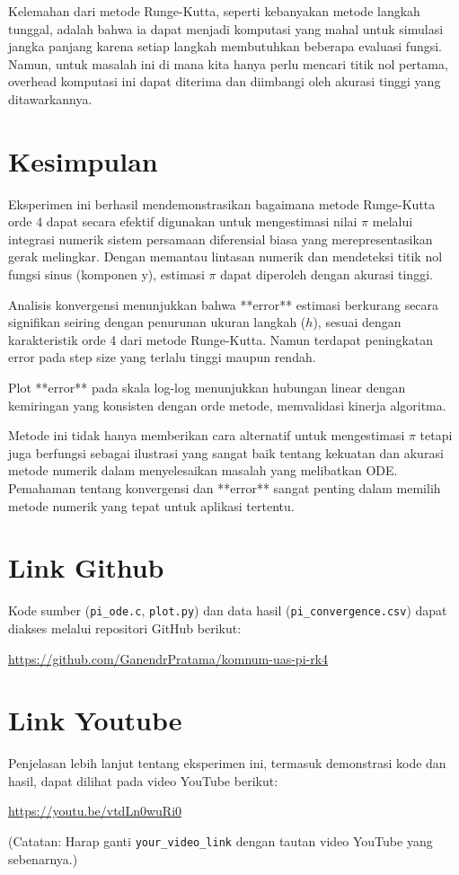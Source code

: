 \documentclass[conference]{IEEEtran}
\begin{document}
Kelemahan dari metode Runge-Kutta, seperti kebanyakan metode langkah tunggal, adalah bahwa ia dapat menjadi komputasi yang mahal untuk simulasi jangka panjang karena setiap langkah membutuhkan beberapa evaluasi fungsi. Namun, untuk masalah ini di mana kita hanya perlu mencari titik nol pertama, overhead komputasi ini dapat diterima dan diimbangi oleh akurasi tinggi yang ditawarkannya.

\section{Kesimpulan}
Eksperimen ini berhasil mendemonstrasikan bagaimana metode Runge-Kutta orde 4 dapat secara efektif digunakan untuk mengestimasi nilai $\pi$ melalui integrasi numerik sistem persamaan diferensial biasa yang merepresentasikan gerak melingkar. Dengan memantau lintasan numerik dan mendeteksi titik nol fungsi sinus (komponen y), estimasi $\pi$ dapat diperoleh dengan akurasi tinggi.

Analisis konvergensi menunjukkan bahwa **error** estimasi berkurang secara signifikan seiring dengan penurunan ukuran langkah ($h$), sesuai dengan karakteristik orde 4 dari metode Runge-Kutta. Namun terdapat peningkatan error pada step size yang terlalu tinggi maupun rendah.

Plot **error** pada skala log-log menunjukkan hubungan linear dengan kemiringan yang konsisten dengan orde metode, memvalidasi kinerja algoritma.

Metode ini tidak hanya memberikan cara alternatif untuk mengestimasi $\pi$ tetapi juga berfungsi sebagai ilustrasi yang sangat baik tentang kekuatan dan akurasi metode numerik dalam menyelesaikan masalah yang melibatkan ODE. Pemahaman tentang konvergensi dan **error** sangat penting dalam memilih metode numerik yang tepat untuk aplikasi tertentu.

\section{Link Github}
Kode sumber (\texttt{pi\_ode.c}, \texttt{plot.py}) dan data hasil (\texttt{pi\_convergence.csv}) dapat diakses melalui repositori GitHub berikut:
\begin{center}
\url{https://github.com/GanendrPratama/komnum-uas-pi-rk4}
\end{center}

\section{Link Youtube}
Penjelasan lebih lanjut tentang eksperimen ini, termasuk demonstrasi kode dan hasil, dapat dilihat pada video YouTube berikut:
\begin{center}
\url{https://youtu.be/vtdLn0wuRi0}
\end{center}
(Catatan: Harap ganti \texttt{your\_video\_link} dengan tautan video YouTube yang sebenarnya.)
\end{document}
